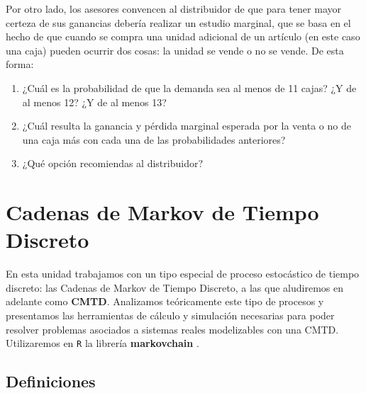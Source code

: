 \documentclass[
]{book}
\providecommand{\tightlist}{%
  \setlength{\itemsep}{0pt}\setlength{\parskip}{0pt}}
\theoremstyle{definition}
\theoremstyle{definition}
\theoremstyle{definition}
\theoremstyle{definition}
\theoremstyle{remark}
\begin{document}
Por otro lado, los asesores convencen al distribuidor de que para tener mayor certeza de sus ganancias debería realizar un estudio marginal, que se basa en el hecho de que cuando se compra una unidad adicional de un artículo (en este caso una caja) pueden ocurrir dos cosas: la unidad se vende o no se vende. De esta forma:

\begin{enumerate}
\def\labelenumi{\arabic{enumi}.}
\tightlist
\item
  ¿Cuál es la probabilidad de que la demanda sea al menos de 11 cajas? ¿Y de al menos 12? ¿Y de al menos 13?
\item
  ¿Cuál resulta la ganancia y pérdida marginal esperada por la venta o no de una caja más con cada una de las probabilidades anteriores?
\item
  ¿Qué opción recomiendas al distribuidor?
\end{enumerate}

\hypertarget{cmtd}{%
\chapter{Cadenas de Markov de Tiempo Discreto}\label{cmtd}}

En esta unidad trabajamos con un tipo especial de proceso estocástico de tiempo discreto: las Cadenas de Markov de Tiempo Discreto, a las que aludiremos en adelante como \textbf{CMTD}. Analizamos teóricamente este tipo de procesos y presentamos las herramientas de cálculo y simulación necesarias para poder resolver problemas asociados a sistemas reales modelizables con una CMTD. Utilizaremos en \texttt{R} la librería \textbf{markovchain} \citep{R-markovchain}.

\hypertarget{definiciones}{%
\section{Definiciones}\label{definiciones}}
\end{document}
